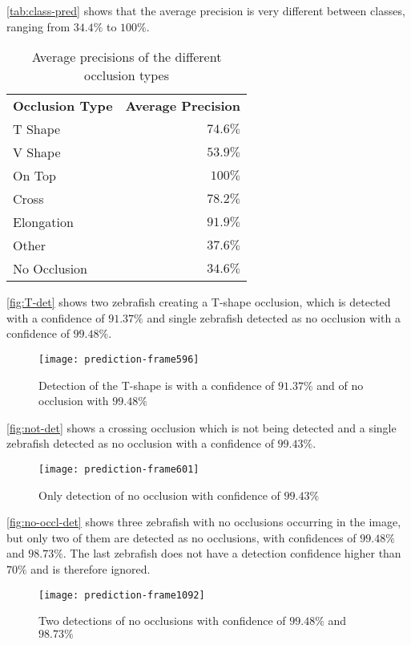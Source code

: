 \autoref{tab:class-pred} shows that the average precision is very different between classes, ranging from $34.4\%$ to $ 100\% $.
\begin{table}[H]
	\centering
	\caption{Average precisions of the different occlusion types}
	\label{tab:class-pred}
	\begin{tabular}{lr}
		\textbf{Occlusion Type} & \textbf{Average Precision} \\\rowcolor{lightGrey}\hline
		T Shape                 & $ 74.6\% $                     \\
		V Shape                 & $ 53.9\% $                    \\\rowcolor{lightGrey}
		On Top                  & $ 100\% $                      \\
		Cross                   & $ 78.2\% $                     \\\rowcolor{lightGrey}
		Elongation              & $ 91.9\% $                     \\
		Other                   & $ 37.6\% $                     \\\rowcolor{lightGrey}
		No Occlusion            & $ 34.6\% $                    
	\end{tabular}
\end{table}



\autoref{fig:T-det} shows two zebrafish creating a T-shape occlusion, which is detected with a confidence of $91.37\%$ and single zebrafish detected as no occlusion with a confidence of $99.48\%$.
\begin{figure}[H]
	\centering
	\texttt{[image: prediction-frame596]}
	\caption{Detection of the T-shape is with a confidence of $91.37\%$ and of no occlusion with $99.48\%$}
	\label{fig:T-det}
\end{figure}

\autoref{fig:not-det} shows a crossing occlusion which is not being detected and a single zebrafish detected as no occlusion with a confidence of $99.43\%$.
\begin{figure}[H]
	\centering
	\texttt{[image: prediction-frame601]}
	\caption{Only detection of no occlusion with confidence of $99.43\%$}
	\label{fig:not-det}
\end{figure}

\autoref{fig:no-occl-det} shows three zebrafish with no occlusions occurring in the image, but only two of them are detected as no occlusions, with confidences of $99.48\%$ and $98.73\%$. The last zebrafish does not have a detection confidence higher than $70\%$ and is therefore ignored.
\begin{figure}[H]
	\centering
	\texttt{[image: prediction-frame1092]}
	\caption{Two detections of no occlusions with confidence of $99.48\%$ and $98.73\%$}
	\label{fig:no-occl-det}
\end{figure}